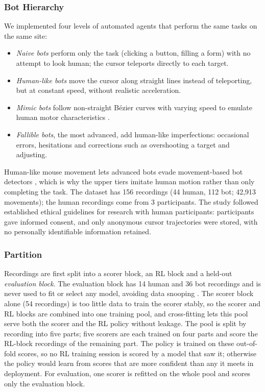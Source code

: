 \documentclass{ieeetj}
\begin{document}
\subsubsection{Bot Hierarchy}
We implemented four levels of automated agents that perform the same tasks on the same site:
\begin{itemize}[leftmargin=*, itemsep=1pt]
\item \emph{Naive bots} perform only the task (clicking a button, filling a form) with no attempt to look human; the cursor teleports directly to each target.
\item \emph{Human-like bots} move the cursor along straight lines instead of teleporting, but at constant speed, without realistic acceleration.
\item \emph{Mimic bots} follow non-straight B\'ezier curves with varying speed to emulate human motor characteristics \cite{bezier2025,bezier_bots_2022}.
\item \emph{Fallible bots}, the most advanced, add human-like imperfections: occasional errors, hesitations and corrections such as overshooting a target and adjusting.
\end{itemize}
Human-like mouse movement lets advanced bots evade movement-based bot detectors \cite{bezier_bots_2022}, which is why the upper tiers imitate human motion rather than only completing the task. The dataset has 156 recordings (44 human, 112 bot; 42{,}913 movements); the human recordings come from 3 participants. The study followed established ethical guidelines for research with human participants: participants gave informed consent, and only anonymous cursor trajectories were stored, with no personally identifiable information retained.

\vspace{-15pt}
\subsubsection{Partition}
Recordings are first split into a scorer block, an RL block and a held-out \emph{evaluation block}. The evaluation block has 14 human and 36 bot recordings and is never used to fit or select any model, avoiding data snooping \cite{arp_2022}. The scorer block alone (54 recordings) is too little data to train the scorer stably, so the scorer and RL blocks are combined into one training pool, and cross-fitting \cite{wolpert_1992,chernozhukov_2018} lets this pool serve both the scorer and the RL policy without leakage. The pool is split by recording into five parts; five scorers are each trained on four parts and score the RL-block recordings of the remaining part. The policy is trained on these out-of-fold scores, so no RL training session is scored by a model that saw it; otherwise the policy would learn from scores that are more confident than any it meets in deployment. For evaluation, one scorer is refitted on the whole pool and scores only the evaluation block.
\end{document}
